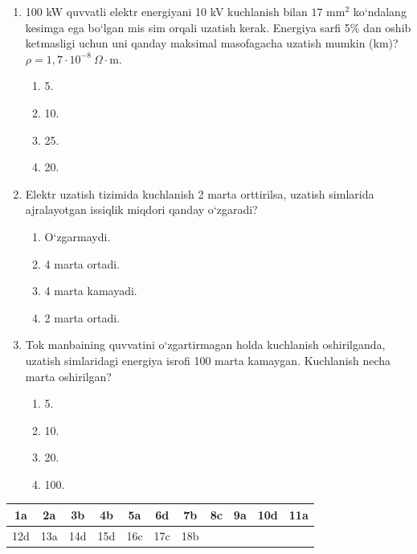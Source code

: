 \begin{enumerate}
\item 100 kW quvvatli elektr energiyani 10 kV kuchlanish bilan $17\text{ mm}^2$ ko‘ndalang kesimga ega bo‘lgan mis sim orqali uzatish kerak. Energiya sarfi 5\% dan oshib ketmasligi uchun uni qanday maksimal masofagacha uzatish mumkin (km)? $\rho = 1,7 \cdot 10^{-8}\ \Omega\cdot\text{m}$.
\begin{enumerate}[label=\Alph*)]
\item 5.
\item 10.
\item 25.
\item 20.
\end{enumerate}

\item Elektr uzatish tizimida kuchlanish 2 marta orttirilsa, uzatish simlarida ajralayotgan issiqlik miqdori qanday o‘zgaradi?
\begin{enumerate}[label=\Alph*)]
\item O‘zgarmaydi.
\item 4 marta ortadi.
\item 4 marta kamayadi.
\item 2 marta ortadi.
\end{enumerate}

\item Tok manbaining quvvatini o‘zgartirmagan holda kuchlanish oshirilganda, uzatish simlaridagi energiya isrofi 100 marta kamaygan. Kuchlanish necha marta oshirilgan?
\begin{enumerate}[label=\Alph*)]
\item 5.
\item 10.
\item 20.
\item 100.
\end{enumerate}

\end{enumerate}



\begin{table}[!ht]
\centering
\begin{tabular}{|c|c|c|c|c|c|c|c|c|c|c|}
\hline
1a & 2a & 3b & 4b & 5a & 6d & 7b & 8c & 9a & 10d & 11a \\ \hline
12d & 13a & 14d & 15d & 16c & 17c & 18b & & & & \\ \hline
\end{tabular}
\end{table}











